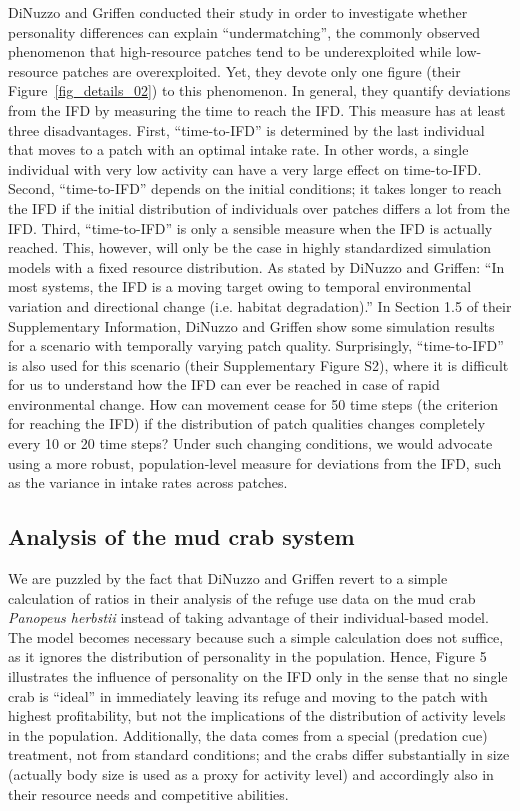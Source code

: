 \begin{interludeenv}
	DiNuzzo and Griffen conducted their study in order to investigate whether personality differences can explain ``undermatching'', the commonly observed phenomenon that high-resource patches tend to be underexploited while low-resource patches are overexploited.
	Yet, they devote only one figure (their Figure~\ref{fig_details_02}) to this phenomenon.
	In general, they quantify deviations from the IFD by measuring the time to reach the IFD.
	This measure has at least three disadvantages.
	First, ``time-to-IFD'' is determined by the last individual that moves to a patch with an optimal intake rate.
	In other words, a single individual with very low activity can have a very large effect on time-to-IFD.
	Second, ``time-to-IFD'' depends on the initial conditions; it takes longer to reach the IFD if the initial distribution of individuals over patches differs a lot from the IFD.
	Third, ``time-to-IFD'' is only a sensible measure when the IFD is actually reached.
	This, however, will only be the case in highly standardized simulation models with a fixed resource distribution.
	As stated by DiNuzzo and Griffen: ``In most systems, the IFD is a moving target owing to temporal environmental variation and directional change (i.e. habitat degradation).'' 
	In Section 1.5 of their Supplementary Information, DiNuzzo and Griffen show some simulation results for a scenario with temporally varying patch quality.
	Surprisingly, ``time-to-IFD'' is also used for this scenario (their Supplementary Figure S2), where it is difficult for us to understand how the IFD can ever be reached in case of rapid environmental change.
	How can movement cease for 50 time steps (the criterion for reaching the IFD) if the distribution of patch qualities changes completely every 10 or 20 time steps? Under such changing conditions, we would advocate using a more robust, population-level measure for deviations from the IFD, such as the variance in intake rates across patches. 
	
	\subsection*{Analysis of the mud crab system}
	
	We are puzzled by the fact that DiNuzzo and Griffen revert to a simple calculation of ratios in their analysis of the refuge use data on the mud crab \textit{Panopeus herbstii}  instead of taking advantage of their individual-based model.
	The model becomes necessary because such a simple calculation does not suffice, as it ignores the distribution of personality in the population.
	Hence, Figure 5 illustrates the influence of personality on the IFD only in the sense that no single crab is ``ideal'' in immediately leaving its refuge and moving to the patch with highest profitability, but not the implications of the distribution of activity levels in the population.
	Additionally, the data comes from a special (predation cue) treatment, not from standard conditions; and the crabs differ substantially in size (actually body size is used as a proxy for activity level) and accordingly also in their resource needs and competitive abilities. 
	

\end{interludeenv}
